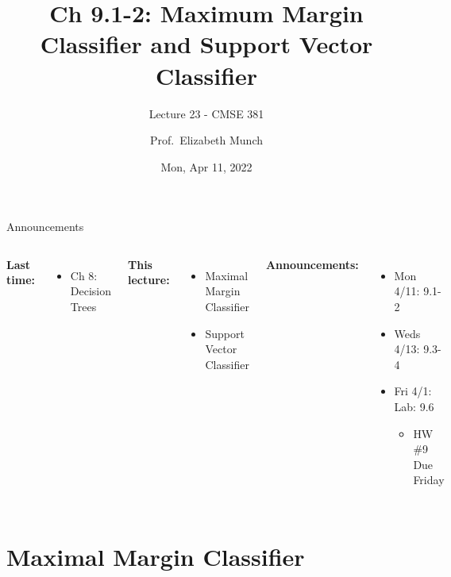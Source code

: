 \documentclass[aspectratio=169,usenames,dvipsnames]{beamer}
\begin{document}
\title[]{Ch 9.1-2: Maximum Margin Classifier and Support Vector Classifier}
\subtitle{Lecture 23 - CMSE 381}
\date{Mon, Apr 11, 2022}



\author[Dr.~Munch]{Prof.~Elizabeth Munch}

\begin{frame}
 \titlepage


\end{frame}
\begin{frame}[c]{Announcements }

\begin{columns}
\centering

	\textbf{Last time:}
	\begin{itemize}
	\item Ch 8: Decision Trees
	\end{itemize}

	\vspace{.2in}

	\textbf{This lecture:}
	\begin{itemize}
	\item Maximal Margin Classifier
	\item Support Vector Classifier
\end{itemize}


\centering

\textbf{Announcements:}
	\begin{itemize}
	\item Mon 4/11: 9.1-2
	\item Weds 4/13: 9.3-4
	\item Fri 4/1: Lab: 9.6
	\begin{itemize}
		\item HW \#9 Due Friday
	\end{itemize}

	\end{itemize}
\end{columns}

\end{frame}



\section{Maximal Margin Classifier}
\end{document}
